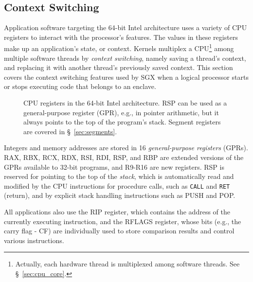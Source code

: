 \subsection{Context Switching}
\label{sec:registers}

Application software targeting the 64-bit Intel architecture uses a variety of
CPU registers to interact with the processor's features. The values in these
registers make up an application's state, or context. Kernels multiplex a
CPU\footnote{Actually, each hardware thread is multiplexed among software
threads. See \S~\ref{sec:cpu_core}.}
among multiple software threads by \textit{context switching}, namely saving a
thread's context, and replacing it with another thread's previously saved
context. This section covers the context switching features used by SGX when a
logical processor starts or stops executing code that belongs to an enclave.


\begin{figure}[hbt]
  \caption{
    CPU registers in the 64-bit Intel architecture. RSP can be used as a
    general-purpose register (GPR), e.g., in pointer arithmetic, but it always
    points to the top of the program's stack. Segment registers are covered in
    \S~\ref{sec:segments}.
  }
  \label{fig:cpu_registers}
\end{figure}

Integers and memory addresses are stored in 16 \textit{general-purpose
registers} (GPRs). RAX, RBX, RCX, RDX, RSI, RDI, RSP, and RBP are extended
versions of the GPRs available to 32-bit programs, and R9-R16 are new
registers. RSP is reserved for pointing to the top of the \textit{stack}, which
is automatically read and modified by the CPU instructions for procedure calls,
such as \texttt{CALL} and \texttt{RET} (return), and by explicit stack handling
instructions such as PUSH and POP.

All applications also use the RIP register, which contains the address of the
currently executing instruction, and the RFLAGS register, whose bits (e.g.,
the carry flag - CF) are individually used to store comparison results and
control various instructions.


